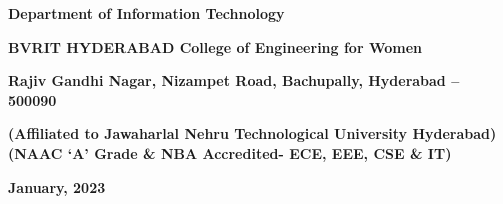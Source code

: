 \documentclass[a4paper,12pt, English]{article}
\begin{document}
\begin{titlepage}
\begin{center}
\begin{large}
\textbf{Department of Information Technology}\\
\end{large}
\begin{Large}
\textbf{BVRIT HYDERABAD College of Engineering for Women}\\
\end{Large}
\begin{normalsize}
\textbf{ Rajiv Gandhi Nagar, Nizampet Road, Bachupally, Hyderabad – 500090}

\textbf{(Affiliated to Jawaharlal Nehru Technological University Hyderabad)}\\

\textbf{(NAAC ‘A’ Grade \& NBA Accredited- ECE, EEE, CSE \& IT)}\\

\end{normalsize}
\begin{large}
\vspace{0.05in}
\textbf{ January, 2023}\\
\end{large}
\end{center}
\end{titlepage}
\end{document}
